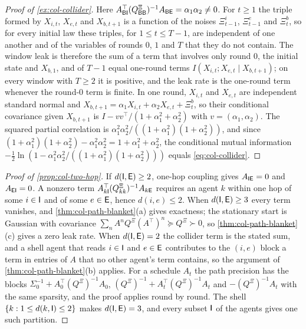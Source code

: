 \begin{proof}[Proof of \cref{ex:col-collider}]
Here $A_{\mathsf{B}\mathsf{I}}^\top(Q^{\Xi}_{\mathsf{B}\mathsf{B}})^{-1}A_{\mathsf{B}\mathsf{E}}=\alpha_1\alpha_2\neq0$. For $t\ge1$ the triple formed by $X_{i,t}$, $X_{e,t}$ and $X_{b,t+1}$ is a function of the noises $\Xi^i_{t-1}$, $\Xi^e_{t-1}$ and $\Xi^b_t$, so for every initial law these triples, for $1\le t\le T-1$, are independent of one another and of the variables of rounds $0$, $1$ and $T$ that they do not contain. The window leak is therefore the sum of a term that involves only round $0$, the initial state and $X_{b,1}$, and of $T-1$ equal one-round terms $I(X_{i,t};X_{e,t}\mid X_{b,t+1})$; on every window with $T\ge2$ it is positive, and the leak rate is the one-round term whenever the round-$0$ term is finite. In one round, $X_{i,t}$ and $X_{e,t}$ are independent standard normal and $X_{b,t+1}=\alpha_1X_{i,t}+\alpha_2X_{e,t}+\Xi^b_t$, so their conditional covariance given $X_{b,t+1}$ is $I-vv^\top/(1+\alpha_1^2+\alpha_2^2)$ with $v=(\alpha_1,\alpha_2)$. The squared partial correlation is $\alpha_1^2\alpha_2^2/((1+\alpha_1^2)(1+\alpha_2^2))$, and since $(1+\alpha_1^2)(1+\alpha_2^2)-\alpha_1^2\alpha_2^2=1+\alpha_1^2+\alpha_2^2$, the conditional mutual information $-\frac12\ln(1-\alpha_1^2\alpha_2^2/((1+\alpha_1^2)(1+\alpha_2^2)))$ equals \eqref{eq:col-collider}.
\end{proof}

\begin{proof}[Proof of \cref{prop:col-two-hop}]
If $d(\mathsf{I},\mathsf{E})\ge2$, one-hop coupling gives $A_{\mathsf{I}\mathsf{E}}=0$ and $A_{\mathsf{E}\mathsf{I}}=0$. A nonzero term $A_{k\mathsf{I}}^\top(Q^{\Xi}_{kk})^{-1}A_{k\mathsf{E}}$ requires an agent $k$ within one hop of some $i\in\mathsf{I}$ and of some $e\in\mathsf{E}$, hence $d(i,e)\le2$. When $d(\mathsf{I},\mathsf{E})\ge3$ every term vanishes, and \cref{thm:col-path-blanket}(a) gives exactness; the stationary start is Gaussian with covariance $\sum_nA^nQ^{\Xi}(A^\top)^n\succeq Q^{\Xi}\succ0$, so \cref{thm:col-path-blanket}(c) gives a zero leak rate. When $d(\mathsf{I},\mathsf{E})=2$ the collider term is the stated sum, and a shell agent that reads $i\in\mathsf{I}$ and $e\in\mathsf{E}$ contributes to the $(i,e)$ block a term in entries of $A$ that no other agent's term contains, so the argument of \cref{thm:col-path-blanket}(b) applies. For a schedule $A_t$ the path precision has the blocks $\Sigma_0^{-1}+A_0^\top(Q^{\Xi})^{-1}A_0$, $(Q^{\Xi})^{-1}+A_t^\top(Q^{\Xi})^{-1}A_t$ and $-(Q^{\Xi})^{-1}A_t$ with the same sparsity, and the proof applies round by round. The shell $\{k:1\le d(k,\mathsf{I})\le2\}$ makes $d(\mathsf{I},\mathsf{E})=3$, and every subset $\mathsf{I}$ of the agents gives one such partition.
\end{proof}

